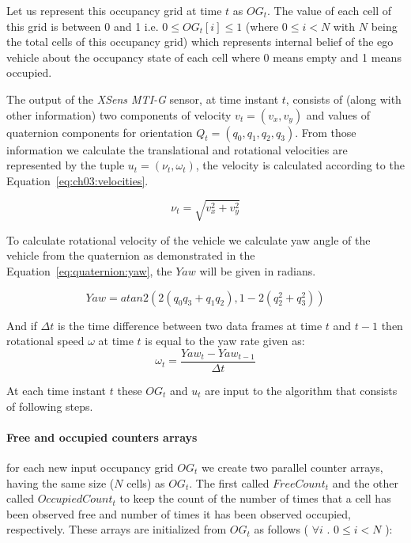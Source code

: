 Let us represent this occupancy grid at time $t$ as  $OG_t$. The value of each cell of this grid is between 0 and 1 i.e. $0 \leq OG_t[i] \leq 1$ (where $0 \leq i<N$ with $N$ being the total cells of this occupancy grid) which represents internal belief of the ego vehicle about the occupancy state of each cell where 0 means empty and 1 means occupied.


The output of the \textit{XSens MTI-G} sensor, at time instant $t$,
consists of (along with other information) two components of velocity $v_t=(v_x, v_y)$ and values of
quaternion components for orientation $Q_t=(q_0, q_1, q_2, q_3)$. From those information we calculate the
translational and rotational velocities are represented by the tuple $u_t=(\nu_t, \omega_t)$, the velocity is calculated according to the Equation~\ref{eq:ch03:velocities}.

\begin{equation}
\label{eq:ch03:velocities}
\nu_t = \sqrt{v_x^2+v_y^2}
\end{equation}

To calculate rotational velocity of the vehicle we calculate yaw angle of the vehicle from the quaternion
as demonstrated in the Equation~\ref{eq:quaternion:yaw}, the $Yaw$ will be given in radians.

\begin{equation}
Yaw = atan2(2(q_0 q_3+q_1 q_2),1-2(q_2^2+q_3^2))
\label{eq:quaternion:yaw}
\end{equation}

And if $\Delta t$ is the time difference between two data frames at time $t$ and $t-1$ then rotational speed $\omega$
at time $t$ is equal to the yaw rate given as:
\begin{equation}
\omega_t = \frac{Yaw_t-Yaw_{t-1}}{\Delta t}
\label{eq:angular:velocity}
\end{equation}

At each time instant $t$ these $OG_t$ and $u_t$ are input to the algorithm that consists of 
following steps.

\paragraph{Free and occupied counters arrays} for each new input occupancy grid $OG_t$ we 
create two parallel counter arrays, having the same size ($N$ cells) as $OG_t$. The first called $FreeCount_t$ and the other called $OccupiedCount_t$ to keep the count of the number of times that a cell has been observed free and number of times it has been observed occupied, respectively. These arrays are initialized from $OG_t$ as follows ( $\forall i$  . $0 \leq i<N$ ):

